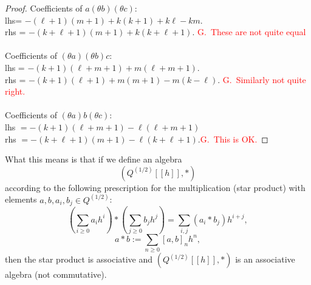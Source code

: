 \documentclass[12pt]{amsart}
\theoremstyle{plain}
\theoremstyle{definition}
\theoremstyle{remark}
\begin{document}
\begin{proof}
\medskip\noindent
Coefficients of $a(\theta b)(\theta c)$:\\
lhs= $-(\ell+1)(m+1)+k(k+1)+k\ell -km$.\\
rhs = $-(k+\ell+1)(m+1)+k(k+\ell+1)$.
\textcolor{red}{G.\ These are not quite equal}\\
\\
Coefficients of $(\theta a)(\theta b)c$:\\
lhs = $-(k+1)(\ell+m+1)+m(\ell+m+1)$.\\
rhs = $-(k+1)(\ell+1)+m(m+1)-m(k-\ell)$.
\textcolor{red}{G.\ Similarly not quite right.}\\
\\
Coefficients of $(\theta a)b(\theta c)$:\\
lhs $= -(k+1)(\ell+m+1) -\ell(\ell+m+1) $\\
rhs $=-(k+\ell+1)(m+1)-\ell(k+\ell+1)$.\textcolor{red}{G.\ This is OK.}
\end{proof}
\fi

\medskip
What this means is that if we define an
algebra 
$$(Q^{(1/2)}[[h]], *)$$
according to the following prescription for the multiplication (star product) with elements $a, b, a_i, b_j\in Q^{(1/2)}$:
$$\left(\sum_{i\geq0} a_ih^i\right)*\left(\sum_{j\geq0} b_jh^j  \right)=\sum_{i, j}(a_i*b_j)h^{i+j},$$
$$a*b:= \sum_{n\geq0} [a, b]_n h^n,$$
then the star product is associative and $(Q^{(1/2)}[[h]], *)$ is an associative algebra (not commutative).
\end{document}
